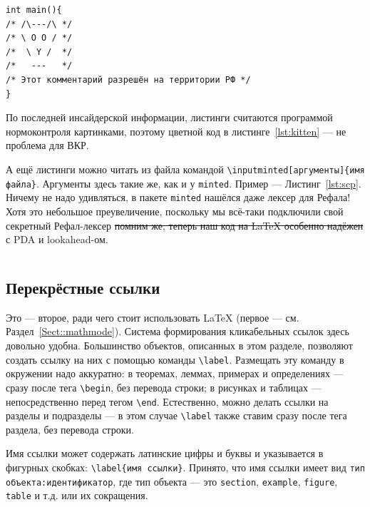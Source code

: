\documentclass[14pt, russian]{scrartcl}
\begin{document}
\begin{listing}
\caption{Пример листинга}
\label{lst:kitten}
\begin{verbatim}
int main(){
/* /\---/\ */
/* \ O O / */
/*  \ Y /  */
/*   ---   */
/* Этот комментарий разрешён на территории РФ */
}
\end{verbatim}
\end{listing}

По последней инсайдерской информации, листинги считаются программой нормоконтроля картинками, поэтому цветной код в листинге~\ref{lst:kitten} --- не проблема для ВКР.

А ещё листинги можно читать из файла командой \texttt{\textbackslash inputminted[аргументы]\{имя файла\}}. Аргументы здесь такие же, как и у \texttt{minted}. Пример --- Листинг~\ref{lst:scp}. Ничему не надо удивляться, в пакете \texttt{minted} нашёлся даже лексер для Рефала! Хотя это небольшое преувеличение, поскольку мы всё-таки подключили свой секретный Рефал-лексер \sout{помним же, теперь наш код на \LaTeX{} особенно надёжен} с PDA и lookahead-ом.
\begin{listing}[!htb]
\caption{Запрещённый на территории РФ листинг, считанный из файла SCP\_new.ref.}
\inputminted[frame=single,fontsize = \footnotesize, linenos, breaklines, xleftmargin = 1.5em,breaksymbol = ""]{refal}{SCP_new.ref}
\label{lst:scp}
\end{listing}


\subsection{Перекрёстные ссылки}

Это --- второе, ради чего стоит использовать \LaTeX{} (первое --- см. Раздел~\ref{Sect::mathmode}). Система формирования кликабельных ссылок здесь довольно удобна. Большинство объектов, описанных в этом разделе, позволяют создать ссылку на них с помощью команды \texttt{\textbackslash{label}}. Размещать эту команду в окружении надо аккуратно: в теоремах, леммах, примерах и определениях --- сразу после тега \texttt{\textbackslash begin}, без перевода строки; в рисунках и таблицах --- непосредственно перед тегом \texttt{\textbackslash end}. Естественно, можно делать ссылки на разделы и подразделы --- в этом случае \texttt{\textbackslash label} также ставим сразу после тега раздела, без перевода строки.

Имя ссылки может содержать латинские цифры и буквы и указывается в фигурных скобках: \texttt{\textbackslash{label\{имя ссылки\}}}. Принято, что имя ссылки имеет вид \texttt{тип объекта:идентификатор}, где тип объекта --- это \texttt{section}, \texttt{example}, \texttt{figure}, \texttt{table} и т.д. или их сокращения. 
\end{document}
